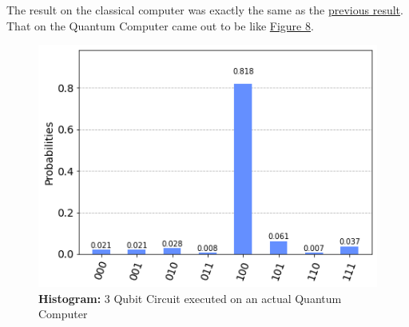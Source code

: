 The result on the classical computer was exactly the same as the \hyperref[fig:5qubit_act]{previous result}. That on the Quantum Computer came out to be like \hyperref[fig:3qubit_act]{Figure 8}.

\begin{figure}[h]%
	\centering
	\includegraphics[width=0.85\linewidth]{./images/3qubit_act.png}
	\caption{\textbf{Histogram:} 3 Qubit Circuit executed on an actual Quantum Computer}%
	\label{fig:3qubit_act}%
\end{figure}